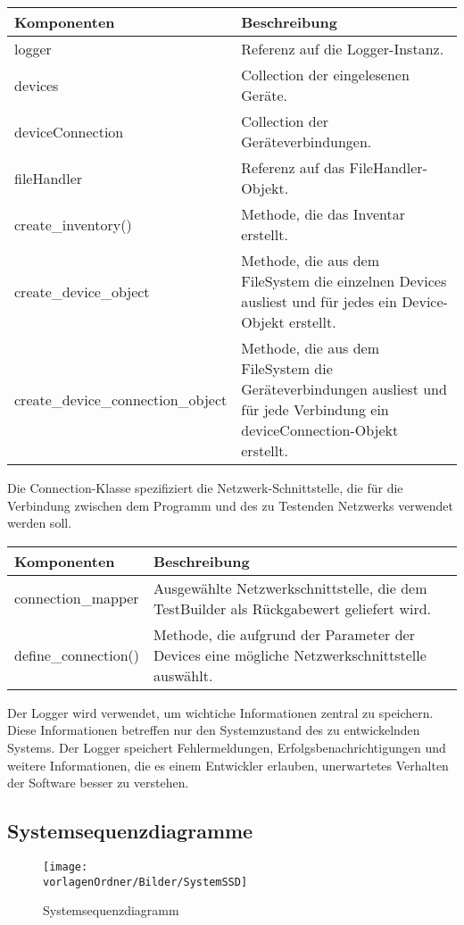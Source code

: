\documentclass[]{subfiles}
\begin{document}
	\begin{tabularx}{\textwidth}{lX}
		\toprule
			Komponenten & Beschreibung \\
		\midrule
			logger & Referenz auf die Logger-Instanz. \\
			devices & Collection der eingelesenen Geräte.\\
			deviceConnection & Collection der Geräteverbindungen. \\
			fileHandler & Referenz auf das FileHandler-Objekt.\\
		\midrule
			create\_inventory() & Methode, die das Inventar erstellt. \\
			create\_device\_object & Methode, die aus dem FileSystem die einzelnen Devices ausliest und für jedes ein Device-Objekt erstellt. \\
			create\_device\_connection\_object & Methode, die aus dem FileSystem die Geräteverbindungen ausliest und für jede Verbindung ein deviceConnection-Objekt erstellt.\\
		\bottomrule
	\end{tabularx}
	\newpage

	Die Connection-Klasse spezifiziert die Netzwerk-Schnittstelle,
	die für die Verbindung zwischen dem Programm und des zu Testenden Netzwerks verwendet
	werden soll.
	

	\begin{tabularx}{\textwidth}{lX}
		\toprule
			Komponenten & Beschreibung \\
		\midrule
			connection\_mapper & Ausgewählte Netzwerkschnittstelle, die dem TestBuilder als Rückgabewert geliefert wird. \\
		\midrule
			define\_connection() & Methode, die aufgrund der Parameter der Devices eine mögliche Netzwerkschnittstelle auswählt.\\
		\bottomrule
	\end{tabularx}

	Der Logger wird verwendet, um wichtiche Informationen zentral zu speichern. 
	Diese Informationen betreffen nur den Systemzustand des zu entwickelnden Systems.
	Der Logger speichert Fehlermeldungen, Erfolgsbenachrichtigungen und weitere Informationen, die es einem Entwickler erlauben, unerwartetes Verhalten der Software besser zu verstehen.

\begin{landscape}
	\subsection{Systemsequenzdiagramme}
	\begin{figure}[h!]
		\texttt{[image: \\vorlagenOrdner/Bilder/SystemSSD]}
		\caption{Systemsequenzdiagramm}
	\end{figure}
		\newpage
\end{landscape}
	
\end{document}
